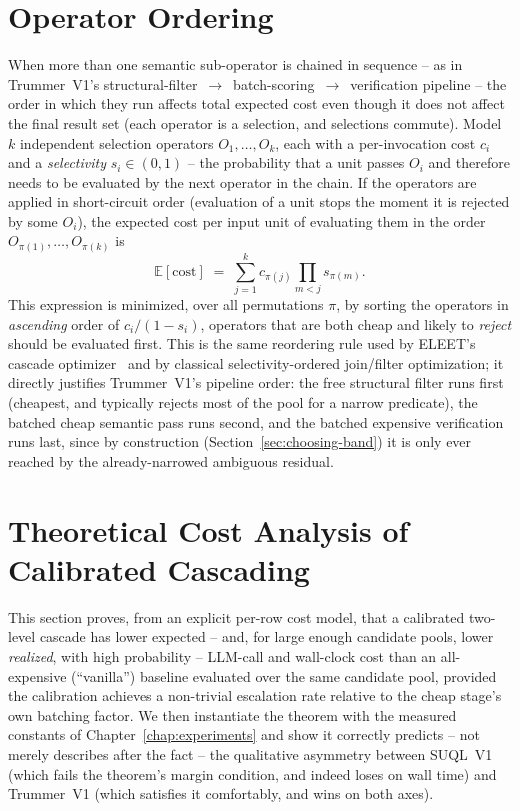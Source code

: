 \section{Operator Ordering}
\label{sec:operator-ordering}

When more than one semantic sub-operator is chained in sequence -- as in
Trummer~V1's structural-filter~$\to$~batch-scoring~$\to$~verification
pipeline -- the order in which they run affects total expected cost even
though it does not affect the final result set (each operator is a
selection, and selections commute). Model $k$ independent selection
operators $O_1, \dots, O_k$, each with a per-invocation cost $c_i$ and a
\emph{selectivity} $s_i \in (0,1)$ -- the probability that a unit passes
$O_i$ and therefore needs to be evaluated by the next operator in the
chain. If the operators are applied in short-circuit order (evaluation
of a unit stops the moment it is rejected by some $O_i$), the expected
cost per input unit of evaluating them in the order $O_{\pi(1)}, \dots,
O_{\pi(k)}$ is
\[
  \mathbb{E}[\text{cost}] \;=\; \sum_{j=1}^{k} c_{\pi(j)} \prod_{m<j} s_{\pi(m)}.
\]
This expression is minimized, over all permutations $\pi$, by sorting
the operators in \emph{ascending} order of $c_i/(1-s_i)$, \ie operators
that are both cheap and likely to \emph{reject} should be evaluated
first. This is the same reordering rule used by ELEET's cascade
optimizer~\cite{eleet} and by classical selectivity-ordered join/filter
optimization; it directly justifies Trummer~V1's pipeline order: the
free structural filter runs first (cheapest, and typically rejects most
of the pool for a narrow predicate), the batched cheap semantic pass
runs second, and the batched expensive verification runs last, since by
construction (Section~\ref{sec:choosing-band}) it is only ever reached
by the already-narrowed ambiguous residual.

\section{Theoretical Cost Analysis of Calibrated Cascading}
\label{sec:theory-cost}

This section proves, from an explicit per-row cost model, that a
calibrated two-level cascade has lower expected -- and, for large enough
candidate pools, lower \emph{realized}, with high probability -- LLM-call
and wall-clock cost than an all-expensive (``vanilla'') baseline
evaluated over the same candidate pool, provided the calibration
achieves a non-trivial escalation rate relative to the cheap stage's own
batching factor. We then instantiate the theorem with the measured
constants of Chapter~\ref{chap:experiments} and show it correctly
predicts -- not merely describes after the fact -- the qualitative
asymmetry between SUQL~V1 (which fails the theorem's margin condition,
and indeed loses on wall time) and Trummer~V1 (which satisfies it
comfortably, and wins on both axes).

